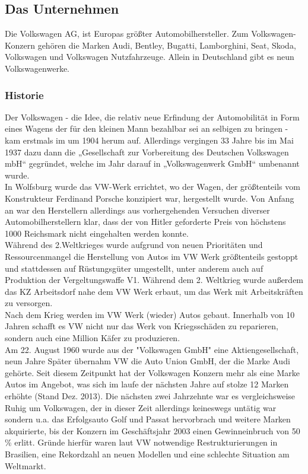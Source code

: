 \documentclass[12pt]{article}
\begin{document}
\subsection{Das Unternehmen}
Die Volkswagen AG, ist Europas größter Automobilhersteller. Zum Volkswagen-Konzern gehören die Marken Audi, Bentley, Bugatti, Lamborghini, Seat, Skoda, Volkswagen und Volkswagen Nutzfahrzeuge. Allein in Deutschland gibt es neun Volkswagenwerke.

\subsubsection{Historie}
Der Volkswagen - die Idee, die relativ neue Erfindung der Automobilität in Form eines Wagens der für den kleinen Mann bezahlbar sei an selbigen zu bringen - kam erstmals im um 1904 herum auf. Allerdings vergingen 33 Jahre bis im Mai 1937 dazu dann die „Gesellschaft zur Vorbereitung des Deutschen Volkswagen mbH“ gegründet, welche im Jahr darauf in „Volkswagenwerk GmbH“ umbenannt wurde. \\
In Wolfsburg wurde das VW-Werk errichtet, wo der Wagen, der größtenteils vom Konstrukteur Ferdinand Porsche konzipiert war, hergestellt wurde. Von Anfang an war den Herstellern allerdings aus vorhergehenden Versuchen diverser Automobilherstellern klar, dass der von Hitler geforderte Preis von höchstens 1000 Reichsmark nicht eingehalten werden konnte. \cite{geschdautos}\\
Während des 2.Weltkrieges wurde aufgrund von neuen Prioritäten und Ressourcenmangel die Herstellung von Autos im VW Werk größtenteils gestoppt und stattdessen auf Rüstungsgüter umgestellt, unter anderem auch auf Produktion der Vergeltungswaffe V1.\cite{autowp} Während dem 2. Weltkrieg wurde außerdem das KZ Arbeitsdorf nahe dem VW Werk erbaut, um das Werk mit Arbeitskräften zu versorgen.\cite{terror}  
\\
Nach dem Krieg werden im VW Werk (wieder) Autos gebaut. Innerhalb von 10 Jahren schafft es VW nicht nur das Werk von Kriegsschäden zu reparieren, sondern auch eine Million Käfer zu produzieren. \cite{ahwest}\\
Am 22. August 1960 wurde aus der "Volkswagen GmbH" eine Aktiengesellschaft, neun Jahre Später übernahm VW die Auto Union GmbH, der die Marke Audi gehörte. Seit diesem Zeitpunkt hat der Volkswagen Konzern mehr als eine Marke Autos im Angebot, was sich im laufe der nächsten Jahre auf stolze 12 Marken erhöhte (Stand Dez. 2013). \cite{vwag}
Die nächsten zwei Jahrzehnte war es vergleichsweise Ruhig um  Volkswagen, der in dieser Zeit allerdings keineswegs untätig war sondern u.a. das Erfolgsauto Golf und Passat hervorbrach und weitere Marken akquirierte, bis der Konzern im Geschäftsjahr 2003 einen Gewinneinbruch von 50 \% erlitt. Gründe hierfür waren laut VW notwendige Restrukturierungen in Brasilien, eine Rekordzahl an neuen Modellen und eine schlechte Situation am Weltmarkt. \cite{sud} \\
\end{document}

